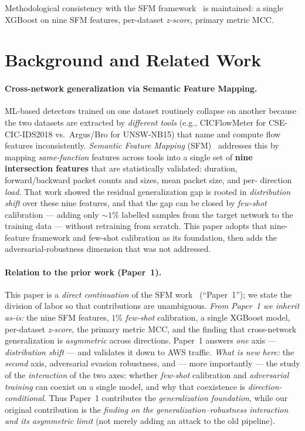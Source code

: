 \documentclass[preprint,12pt,authoryear]{elsarticle}
\begin{document}
\noindent Methodological consistency with the SFM framework~\citep{martono2024sfm}
is maintained: a single XGBoost on nine SFM features, per-dataset \emph{z-score},
primary metric MCC.

\section{Background and Related Work}
\label{sec:related}
\paragraph{Cross-network generalization via Semantic Feature Mapping.}
ML-based detectors trained on one dataset routinely collapse on another because
the two datasets are extracted by \emph{different tools} (e.g., CICFlowMeter for
CSE-CIC-IDS2018 vs.\ Argus/Bro for UNSW-NB15) that name and compute flow features
inconsistently. \emph{Semantic Feature Mapping} (SFM)~\citep{martono2024sfm}
addresses this by mapping \emph{same-function} features across tools into a single
set of \textbf{nine intersection features} that are statistically validated:
duration, forward/backward packet counts and sizes, mean packet size, and per-
direction \emph{load}. That work showed the residual generalization gap is rooted
in \emph{distribution shift} over these nine features, and that the gap can be
closed by \emph{few-shot} calibration --- adding only $\sim 1\%$ labelled samples
from the target network to the training data --- without retraining from scratch.
This paper adopts that nine-feature framework and few-shot calibration as its
foundation, then adds the adversarial-robustness dimension that was not addressed.

\paragraph{Relation to the prior work (Paper~1).} This paper is a \emph{direct
continuation} of the SFM work~\citep{martono2024sfm} (``Paper~1''); we state the
division of labor so that contributions are unambiguous. \emph{From Paper~1 we
inherit as-is:} the nine SFM features, $1\%$ \emph{few-shot} calibration, a single
XGBoost model, per-dataset \emph{z-score}, the primary metric MCC, and the finding
that cross-network generalization is \emph{asymmetric} across directions. Paper~1
answers \emph{one} axis --- \emph{distribution shift} --- and validates it down to
AWS traffic. \emph{What is new here:} the \emph{second} axis, adversarial evasion
robustness, and --- more importantly --- the study of the \emph{interaction} of the
two axes: whether \emph{few-shot} calibration and \emph{adversarial training} can
coexist on a single model, and why that coexistence is \emph{direction-conditional}.
Thus Paper~1 contributes the \emph{generalization foundation}, while our original
contribution is the \emph{finding on the generalization--robustness interaction and
its asymmetric limit} (not merely adding an attack to the old pipeline).
\end{document}
